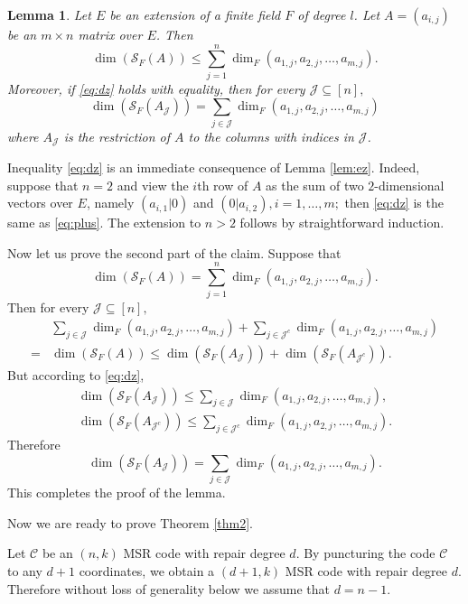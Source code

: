 \documentclass[11pt,onecolumn]{IEEEtran}
\newtheorem{lemma}{Lemma}
\newcommand{\cC}{\mathcal{C}}
\newcommand{\cJ}{\mathcal{J}}
\newcommand{\cS}{\mathcal{S}}
\begin{document}
\begin{lemma}\label{lem:use}
Let $E$ be an extension of a finite field $F$ of degree $l$.
Let $A=(a_{i,j})$ be an $m\times n$ matrix over $E$. Then
  \begin{equation}\label{eq:dz}
\dim(\cS_F(A))
\le \sum_{j=1}^n \dim_F(a_{1,j},a_{2,j},\dots,a_{m,j}).
  \end{equation}
Moreover, if \eqref{eq:dz} holds with equality, then for every $\cJ \subseteq [n],$
  \begin{equation}\label{eq:dzcon}
\dim(\cS_F(A_{\cJ}))
= \sum_{j\in\cJ} \dim_F(a_{1,j},a_{2,j},\dots,a_{m,j})
  \end{equation}
where $A_{\cJ}$ is the restriction of $A$ to the columns with indices in $\cJ$.
\end{lemma}
\begin{IEEEproof} Inequality \eqref{eq:dz} is an immediate consequence of Lemma \ref{lem:ez}. Indeed, suppose that $n=2$ and
view the $i$th row of $A$ as the sum of two $2$-dimensional vectors over $E$, namely $(a_{i,1}|0)$ and $(0|a_{i,2}),i=1,\dots,m;$
then \eqref{eq:dz} is the same as \eqref{eq:plus}. The extension to $n>2$ follows by straightforward induction. 

Now let us prove the second part of the claim. Suppose that 
   $$
   \dim(\cS_F(A))= \sum_{j=1}^n \dim_F(a_{1,j},a_{2,j},\dots,a_{m,j}).
   $$
Then for every $\cJ \subseteq [n],$
\begin{align*}
& \sum_{j\in\cJ} \dim_F(a_{1,j},a_{2,j},\dots,a_{m,j})
+ \sum_{j\in\cJ^c} \dim_F(a_{1,j},a_{2,j},\dots,a_{m,j}) \\ 
= & \dim(\cS_F(A))
\le \dim(\cS_F(A_{\cJ})) + \dim(\cS_F(A_{\cJ^c})).
\end{align*}
But according to \eqref{eq:dz},
\begin{align*}
\dim(\cS_F(A_{\cJ})) \le \sum_{j\in\cJ} \dim_F(a_{1,j},a_{2,j},\dots,a_{m,j}), \\
\dim(\cS_F(A_{\cJ^c})) \le \sum_{j\in\cJ^c} \dim_F(a_{1,j},a_{2,j},\dots,a_{m,j}).
\end{align*}
Therefore
$$
\dim(\cS_F(A_{\cJ})) = \sum_{j\in\cJ} \dim_F(a_{1,j},a_{2,j},\dots,a_{m,j}).
$$
This completes the proof of the lemma.
\end{IEEEproof}


Now we are ready to prove Theorem \ref{thm2}.
{}

Let $\cC$ be an $(n,k)$ MSR code with repair degree $d.$ By puncturing the code $\cC$ to any $d+1$ coordinates, we obtain a $(d+1,k)$ MSR code with repair degree $d$.
Therefore without loss of generality below we assume that $d=n-1$.
\end{document}
